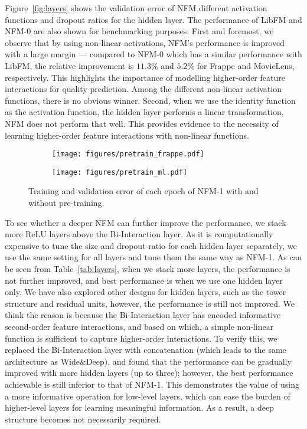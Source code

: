 Figure~\ref{fig:layers} shows the validation error of NFM \wrt different activation functions and dropout ratios for the hidden layer. The performance of LibFM and NFM-0 are also shown for benchmarking purposes. 
First and foremost, we observe that by using non-linear activations, NFM's performance is improved with a large margin --- compared to NFM-0 which has a similar performance with LibFM, the relative improvement is $11.3\%$ and $5.2\%$ for Frappe and MovieLens, respectively. 
This highlights the importance of modelling higher-order feature interactions for quality prediction. 
Among the different non-linear activation functions, there is no obvious winner. 
Second, when we use the identity function as the activation function, \ie the hidden layer performs a linear transformation, NFM does not perform that well. 
This provides evidence to the necessity of learning higher-order feature interactions with non-linear functions. 

\begin{figure}[t]
	\centering
	\begin{subfigure}[b]{0.22\textwidth}
		\centering
		\texttt{[image: figures/pretrain\_frappe.pdf]}
		\vspace{-22pt}
\label{fig:pretrain_frappe}
	\end{subfigure} 
	\begin{subfigure}[b]{0.22\textwidth}
		\centering
		\texttt{[image: figures/pretrain\_ml.pdf]}
		\vspace{-22pt}
\label{fig:pretrain_ml}
	\end{subfigure} 
	\caption{Training and validation error of each epoch of NFM-1 with and without pre-training.}
	\vspace{-12pt}
	\label{fig:pretrain}
\end{figure}

To see whether a deeper NFM can further improve the performance, we stack more ReLU layers above the Bi-Interaction layer. 
As it is computationally expensive to tune the size and dropout ratio for each hidden layer separately, we use the same setting for all layers and tune them the same way as NFM-1. 
As can be seen from Table~\ref{tab:layers}, when we stack more layers, the performance is not further improved, and best performance is when we use one hidden layer only. 
We have also explored other designs for hidden layers,
such as the tower structure and residual units, however, the performance is still not improved. 
We think the reason is because the Bi-Interaction layer has encoded informative second-order feature interactions, and based on which, a simple non-linear function is sufficient to capture higher-order interactions. 
To verify this, we replaced the Bi-Interaction layer with concatenation (which leads to the same architecture as Wide\&Deep), and found that the performance can be gradually improved with more hidden layers (up to three); however, the best performance achievable is still inferior to that of NFM-1.
This demonstrates the value of using a more informative operation for low-level layers, which can ease the burden of higher-level layers for learning meaningful information. As a result, a deep structure becomes not necessarily required.

